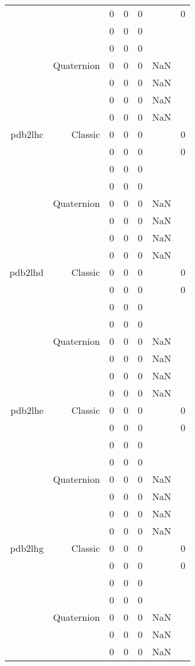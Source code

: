 \begin{xltabular}{\textwidth}{r|rcccSc}
& & 0 & 0 & 0 & & 0 \\
& & 0 & 0 & 0 & & \\
& & 0 & 0 & 0 & & \\
& Quaternion & 0 & 0 & 0 & NaN & \\
& & 0 & 0 & 0 & NaN & \\
& & 0 & 0 & 0 & NaN & \\
& & 0 & 0 & 0 & NaN & \\ \addlinespace
pdb2lhc & Classic & 0 & 0 & 0 & & 0 \\
& & 0 & 0 & 0 & & 0 \\
& & 0 & 0 & 0 & & \\
& & 0 & 0 & 0 & & \\
& Quaternion & 0 & 0 & 0 & NaN & \\
& & 0 & 0 & 0 & NaN & \\
& & 0 & 0 & 0 & NaN & \\
& & 0 & 0 & 0 & NaN & \\ \addlinespace
pdb2lhd & Classic & 0 & 0 & 0 & & 0 \\
& & 0 & 0 & 0 & & 0 \\
& & 0 & 0 & 0 & & \\
& & 0 & 0 & 0 & & \\
& Quaternion & 0 & 0 & 0 & NaN & \\
& & 0 & 0 & 0 & NaN & \\
& & 0 & 0 & 0 & NaN & \\
& & 0 & 0 & 0 & NaN & \\ \addlinespace
pdb2lhe & Classic & 0 & 0 & 0 & & 0 \\
& & 0 & 0 & 0 & & 0 \\
& & 0 & 0 & 0 & & \\
& & 0 & 0 & 0 & & \\
& Quaternion & 0 & 0 & 0 & NaN & \\
& & 0 & 0 & 0 & NaN & \\
& & 0 & 0 & 0 & NaN & \\
& & 0 & 0 & 0 & NaN & \\ \addlinespace
pdb2lhg & Classic & 0 & 0 & 0 & & 0 \\
& & 0 & 0 & 0 & & 0 \\
& & 0 & 0 & 0 & & \\
& & 0 & 0 & 0 & & \\
& Quaternion & 0 & 0 & 0 & NaN & \\
& & 0 & 0 & 0 & NaN & \\
& & 0 & 0 & 0 & NaN & \\

\end{xltabular}
